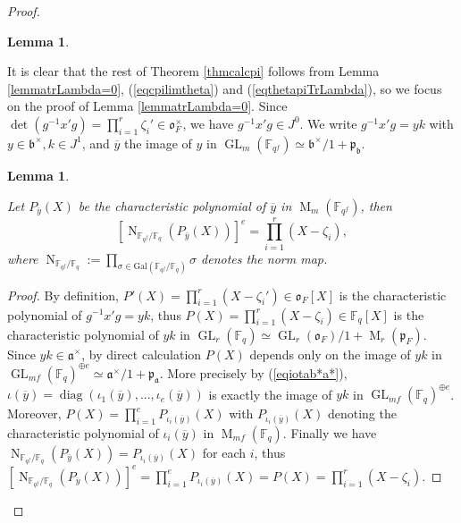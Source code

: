 \documentclass{amsart}
\numberwithin{equation}{section}
\newtheorem{lemma}[theorem]{\bf{Lemma}}
\newcommand{\mrgl}{\operatorname{GL}}
\newcommand{\mrm}{\operatorname{M}}
\newcommand{\mrn}{\operatorname{N}}
\newcommand{\mrdet}{\operatorname{det}}
\newcommand{\mrdiag}{\operatorname{diag}}
\newcommand{\mbf}{\mathbb{F}}
\newcommand{\mfp}{\mathfrak{p}}
\newcommand{\mfo}{\mathfrak{o}}
\newcommand{\mfa}{\mathfrak{a}}
\newcommand{\mfb}{\mathfrak{b}}
\begin{document}
\begin{proof}
\begin{lemma}
			\end{lemma}
			
			It is clear that the rest of Theorem \ref{thmcalcpi} follows from Lemma \ref{lemmatrLambda=0}, (\ref{eqcpilimtheta}) and (\ref{eqthetapiTrLambda}), so we focus on the proof of Lemma \ref{lemmatrLambda=0}. Since $\mrdet(g^{-1}x'g)=\prod_{i=1}^{r}\zeta_{i}'\in\mfo_{F}^{\times}$, we have $g^{-1}x'g\in J^{0}$. We write $g^{-1}x'g=yk$ with $y\in\mfb^{\times}, k\in J^{1}$, and $\overline{y}$ the image of $y$ in $\mrgl_{m}(\mbf_{q^{f}})\simeq\mfb^{\times}/1+\mfp_{\mfb}$.
			
			\begin{lemma}\label{lemmacharpoly}
				
				Let $P_{\overline{y}}(X)$ be the characteristic polynomial of $\overline{y}$ in $\mrm_{m}(\mbf_{q^{f}})$, then $$[\mrn_{\mbf_{q^{f}}/\mbf_{q}}(P_{\overline{y}}(X))]^{e}=\prod_{i=1}^{r}(X-\zeta_{i}),$$ 
				where $\mrn_{\mbf_{q^{f}}/\mbf_{q}}:=\prod_{\sigma\in\mathrm{Gal}(\mbf_{q^{f}}/\mbf_{q})}\sigma$ denotes the norm map.
				
			\end{lemma}
			
			\begin{proof}
				
				By definition, $P'(X)=\prod_{i=1}^{r}(X-\zeta_{i}')\in\mfo_{F}[X]$ is the characteristic polynomial of $g^{-1}x'g=yk$, thus $P(X)=\prod_{i=1}^{r}(X-\zeta_{i})\in \mbf_{q}[X]$ is the characteristic polynomial of $yk$ in $\mrgl_{r}(\mbf_{q})\simeq\mrgl_{r}(\mfo_{F})/1+\mrm_{r}(\mfp_{F})$. Since $yk\in\mfa^{\times}$, by direct calculation $P(X)$ depends only on the image of $yk$ in $\mrgl_{mf}(\mbf_{q})^{\oplus e}\simeq\mfa^{\times}/1+\mfp_{\mfa}$. More precisely by (\ref{eqiotab*a*}), $\iota(\overline{y})=\mrdiag(\iota_{1}(\overline{y}),...,\iota_{e}(\overline{y}))$ is exactly the image of $yk$ in $\mrgl_{mf}(\mbf_{q})^{\oplus e}$.   %
				Moreover, $P(X)=\prod_{i=1}^{e}P_{\iota_{i}(\overline{y})}(X)$ with $P_{\iota_{i}(\overline{y})}(X)$ denoting the characteristic polynomial of $\iota_{i}(\overline{y})$ in $\mrm_{mf}(\mbf_{q})$. Finally we have $\mrn_{\mbf_{q^{f}}/\mbf_{q}}(P_{\overline{y}}(X))=P_{\iota_{i}(\overline{y})}(X)$ for each $i$, thus
				$[\mrn_{\mbf_{q^{f}}/\mbf_{q}}(P_{\overline{y}}(X))]^{e}=\prod_{i=1}^{e}P_{\iota_{i}(\overline{y})}(X)=P(X)=\prod_{i=1}^{r}(X-\zeta_{i}).$
				
			\end{proof}
			

\end{proof}
\end{document}
